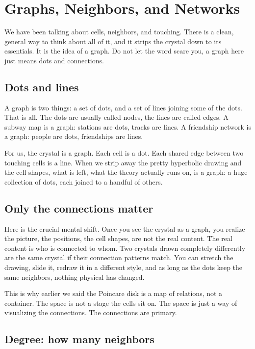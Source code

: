 \section{Graphs, Neighbors, and Networks}

We have been talking about cells, neighbors, and touching. There is a clean, general way to think about all of it, and it strips the crystal down to its essentials. It is the idea of a graph. Do not let the word scare you, a graph here just means dots and connections.

\subsection{Dots and lines}

A graph is two things: a set of dots, and a set of lines joining some of the dots. That is all. The dots are usually called nodes, the lines are called edges. A subway map is a graph: stations are dots, tracks are lines. A friendship network is a graph: people are dots, friendships are lines.

For us, the crystal is a graph. Each cell is a dot. Each shared edge between two touching cells is a line. When we strip away the pretty hyperbolic drawing and the cell shapes, what is left, what the theory actually runs on, is a graph: a huge collection of dots, each joined to a handful of others.

\subsection{Only the connections matter}

Here is the crucial mental shift. Once you see the crystal as a graph, you realize the picture, the positions, the cell shapes, are not the real content. The real content is who is connected to whom. Two crystals drawn completely differently are the same crystal if their connection patterns match. You can stretch the drawing, slide it, redraw it in a different style, and as long as the dots keep the same neighbors, nothing physical has changed.

This is why earlier we said the Poincare disk is a map of relations, not a container. The space is not a stage the cells sit on. The space is just a way of visualizing the connections. The connections are primary.

\subsection{Degree: how many neighbors}

